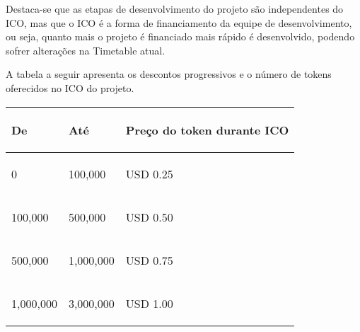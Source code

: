 \documentclass[
	article,			%
	12pt,				%
	oneside,			%
	a4paper,			%
	brazil,				%
	english,
	sumario=tradicional
	]{abntex2}
\begin{document}
Destaca-se que as etapas de desenvolvimento do projeto são independentes do ICO, mas que o ICO é a forma de financiamento da equipe de desenvolvimento, ou seja, quanto mais o projeto é financiado mais rápido é desenvolvido, podendo sofrer alterações na Timetable atual. 

A tabela a seguir apresenta os descontos progressivos e o número de tokens oferecidos no ICO do projeto.
\begin{table}[!h]
        \centering
        
\begin{tabular}{p{}p{}|p{}}
\begin{center}
\textbf{De}
\end{center}
 & \begin{center}
\textbf{Até}
\end{center}
 & \begin{center}
\textbf{Preço do token durante ICO}
\end{center}
 \\
\hline 
 \begin{center}
{\small 0}
\end{center}
 & \begin{center}
{\small 100,000}
\end{center}
 & \begin{center}
{\small USD 0.25}
\end{center}
 \\
\hline 
 \begin{center}
{\small 100,000}
\end{center}
 & \begin{center}
{\small 500,000}
\end{center}
 & \begin{center}
{\small USD 0.50}
\end{center}
 \\
\hline 
 \begin{center}
{\small 500,000}
\end{center}
 & \begin{center}
{\small 1,000,000}
\end{center}
 & \begin{center}
{\small USD 0.75}
\end{center}
 \\
\hline 
 \begin{center}
{\small 1,000,000}
\end{center}
 & \begin{center}
{\small 3,000,000}
\end{center}
 & \begin{center}
{\small USD 1.00}
\end{center}
 \\

\end{tabular}
        \end{table}
\end{document}

